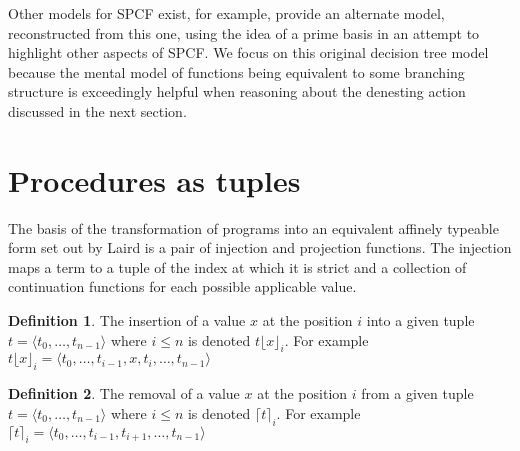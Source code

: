 \documentclass[12pt,a4paper]{report}
\theoremstyle{definition}
\newtheorem{definition}{Definition}[chapter]%
\theoremstyle{remark}
\begin{document}
Other models for SPCF exist, for example, \cite{kanneganti_1993} provide an alternate model, reconstructed from this one, using the idea of a prime basis \citep{Winskel1980EventsIC} in an attempt to highlight other aspects of SPCF. We focus on this original decision tree model because the mental model of functions being equivalent to some branching structure is exceedingly helpful when reasoning about the denesting action discussed in the next section.

\section{Procedures as tuples}\label{section:inj-proj}
The basis of the transformation of programs into an equivalent affinely typeable form set out by Laird is a pair of injection and projection functions. The injection maps a term to a tuple of the index at which it is strict and a collection of continuation functions for each possible applicable value. 

\begin{definition}
    The insertion of a value $x$ at the position $i$ into a given tuple $t = \langle t_0, \dots, t_{n-1} \rangle$ where $i \leq n$ is denoted $t\lfloor x \rfloor_i$. For example $t\lfloor x \rfloor_i = \langle t_0, \dots, t_{i-1}, x, t_i, \dots, t_{n-1} \rangle$
\end{definition}

\begin{definition}
    The removal of a value $x$ at the position $i$ from a given tuple $t = \langle t_0, \dots, t_{n-1} \rangle$ where $i \le n$ is denoted $\lceil t \rceil_i$. For example $\lceil t \rceil_i = \langle t_0, \dots, t_{i-1}, t_{i+1}, \dots, t_{n-1} \rangle$
\end{definition}
\end{document}
